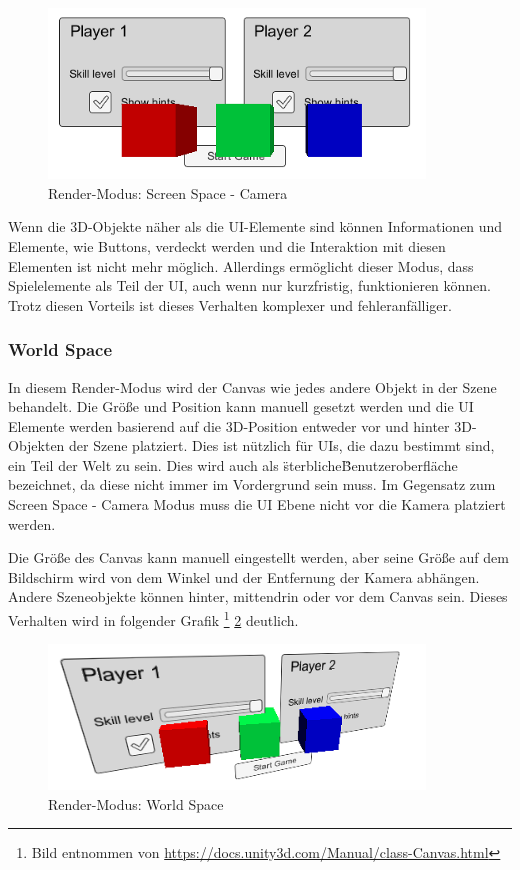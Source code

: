 \begin{figure}[htbp]
	\centering 
	\label{renderCamera}
	\includegraphics[width=10cm]{pics/CanvasCamera.png}
	\caption{Render-Modus: Screen Space - Camera}
\end{figure}

Wenn die 3D-Objekte näher als die UI-Elemente sind können Informationen und Elemente, wie Buttons, verdeckt werden und die Interaktion mit diesen Elementen ist nicht mehr möglich. Allerdings ermöglicht dieser Modus, dass Spielelemente als Teil der UI, auch wenn nur kurzfristig, funktionieren können. Trotz diesen Vorteils ist dieses Verhalten komplexer und fehleranfälliger.

\subsubsection{World Space}
In diesem Render-Modus wird der Canvas wie jedes andere Objekt in der Szene behandelt. Die Größe und Position kann manuell gesetzt werden und die UI Elemente werden basierend auf die 3D-Position entweder vor und hinter 3D-Objekten der Szene platziert. Dies ist nützlich für UIs, die dazu bestimmt sind, ein Teil der Welt zu sein. Dies wird auch als \"sterbliche\" Benutzeroberfläche bezeichnet, da diese nicht immer im Vordergrund sein muss. Im Gegensatz zum Screen Space - Camera Modus muss die UI Ebene nicht vor die Kamera platziert werden.

Die Größe des Canvas kann manuell eingestellt werden, aber seine Größe auf dem Bildschirm wird von dem Winkel und der Entfernung der Kamera abhängen. Andere Szeneobjekte können hinter, mittendrin oder vor dem Canvas sein. Dieses Verhalten wird in folgender Grafik \footnote{Bild entnommen von \url{https://docs.unity3d.com/Manual/class-Canvas.html}} \ref{renderWorldSpace} deutlich.

\begin{figure}[htbp]
	\centering 
	\label{renderWorldSpace}
	\includegraphics[width=10cm]{pics/CanvasWorldSpace.png}
	\caption{Render-Modus: World Space}
\end{figure}


